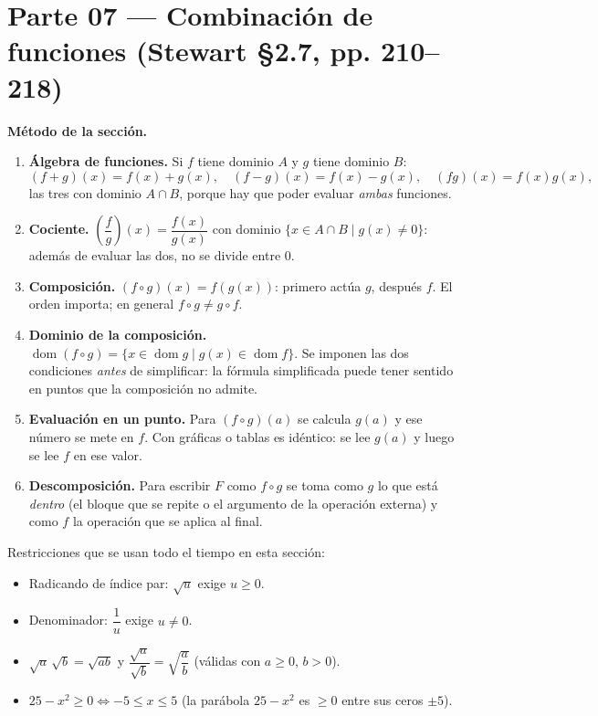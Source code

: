 \documentclass[11pt]{article}
\begin{document}
\section*{Parte 07 — Combinación de funciones (Stewart §2.7, pp. 210–218)}

\begin{teo}
\textbf{Método de la sección.}
\begin{enumerate}[leftmargin=*]
\item \textbf{Álgebra de funciones.} Si $f$ tiene dominio $A$ y $g$ tiene dominio $B$:
\[
(f+g)(x)=f(x)+g(x),\quad (f-g)(x)=f(x)-g(x),\quad (fg)(x)=f(x)g(x),
\]
las tres con dominio $A\cap B$, porque hay que poder evaluar \emph{ambas} funciones.
\item \textbf{Cociente.} $\left(\dfrac{f}{g}\right)(x)=\dfrac{f(x)}{g(x)}$ con dominio $\{x\in A\cap B \mid g(x)\neq 0\}$: además de evaluar las dos, no se divide entre $0$.
\item \textbf{Composición.} $(f\circ g)(x)=f(g(x))$: primero actúa $g$, después $f$. El orden importa; en general $f\circ g\neq g\circ f$.
\item \textbf{Dominio de la composición.} $\operatorname{dom}(f\circ g)=\{x\in \operatorname{dom} g \mid g(x)\in \operatorname{dom} f\}$. Se imponen las dos condiciones \emph{antes} de simplificar: la fórmula simplificada puede tener sentido en puntos que la composición no admite.
\item \textbf{Evaluación en un punto.} Para $(f\circ g)(a)$ se calcula $g(a)$ y ese número se mete en $f$. Con gráficas o tablas es idéntico: se lee $g(a)$ y luego se lee $f$ en ese valor.
\item \textbf{Descomposición.} Para escribir $F$ como $f\circ g$ se toma como $g$ lo que está \emph{dentro} (el bloque que se repite o el argumento de la operación externa) y como $f$ la operación que se aplica al final.
\end{enumerate}
\end{teo}

\begin{tip}
Restricciones que se usan todo el tiempo en esta sección:
\begin{itemize}[leftmargin=*]
\item Radicando de índice par: $\sqrt{u}$ exige $u\ge 0$.
\item Denominador: $\dfrac{1}{u}$ exige $u\neq 0$.
\item $\sqrt{a}\,\sqrt{b}=\sqrt{ab}$ y $\dfrac{\sqrt{a}}{\sqrt{b}}=\sqrt{\dfrac{a}{b}}$ (válidas con $a\ge 0$, $b>0$).
\item $25-x^2\ge 0 \iff -5\le x\le 5$ (la parábola $25-x^2$ es $\ge 0$ entre sus ceros $\pm 5$).
\end{itemize}
\end{tip}
\end{document}
